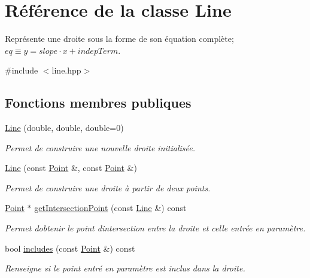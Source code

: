 \hypertarget{classLine}{}\section{Référence de la classe Line}
\label{classLine}


Représente une droite sous la forme de son équation complète; $ eq \equiv y = slope \cdot x + indepTerm $.  




{\ttfamily \#include $<$line.\+hpp$>$}

\subsection*{Fonctions membres publiques}
\begin{DoxyCompactItemize}
\item 
\hyperlink{classLine_a51acfb27d7778c0f96624edc27dab5c7}{Line} (double, double, double=0)
\begin{DoxyCompactList}\small\item\em Permet de construire une nouvelle droite initialisée. \end{DoxyCompactList}\item 
\hyperlink{classLine_a13562b07c6a09b1bc7720a6c4f77fb3e}{Line} (const \hyperlink{classPoint}{Point} \&, const \hyperlink{classPoint}{Point} \&)
\begin{DoxyCompactList}\small\item\em Permet de construire une droite à partir de deux points. \end{DoxyCompactList}\item 
\hyperlink{classPoint}{Point} $\ast$ \hyperlink{classLine_a9449a6777c0d4783b2210c057ae1c811}{get\+Intersection\+Point} (const \hyperlink{classLine}{Line} \&) const 
\begin{DoxyCompactList}\small\item\em Permet d\textquotesingle{}obtenir le point d\textquotesingle{}intersection entre la droite et celle entrée en paramètre. \end{DoxyCompactList}\item 
bool \hyperlink{classLine_a36eaf7c0fcc008e1e72a1a82137f42a4}{includes} (const \hyperlink{classPoint}{Point} \&) const 
\begin{DoxyCompactList}\small\item\em Renseigne si le point entré en paramètre est inclus dans la droite. \end{DoxyCompactList}\item 

\end{DoxyCompactItemize}
